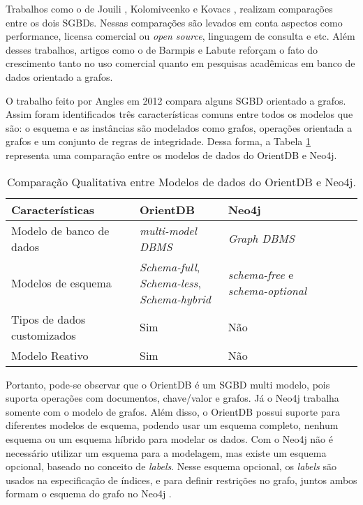 	Trabalhos como o de Jouili \cite{jouili2013empirical}, Kolomivcenko \cite{kolomivcenko2013experimental} e Kovacs \cite{kovacs2016cassandra}, realizam comparações entre os dois SGBDs. Nessas comparações são levados em conta aspectos como performance, licensa comercial ou \textit{open source}, linguagem de consulta e etc. Além desses trabalhos, artigos como o de Barmpis \cite{barmpis2014evaluation} e Labute \cite{labute2014review} reforçam o fato do crescimento tanto no uso comercial quanto em pesquisas acadêmicas em banco de dados orientado a grafos.

	O trabalho feito por Angles \cite{angles2012comparison} em 2012 compara alguns SGBD orientado a grafos. Assim foram identificados três características comuns entre todos os modelos que são: o esquema e as instâncias são modelados como grafos, operações orientada a grafos e um conjunto de regras de integridade. Dessa forma, a Tabela \ref{table:1} representa uma comparação entre os modelos de dados do OrientDB e Neo4j.
	
\begin{table}[h!]
\centering
\caption{Comparação Qualitativa entre Modelos de dados do OrientDB e Neo4j.}
\begin{tabular}{|l|l|l|l|l|}
\hline
Características                        & OrientDB                                                                        & Neo4j \\ \hline
Modelo de banco de dados    & \textit{multi-model DBMS}                                                       & \textit{Graph DBMS}  \\ \hline
Modelos de esquema          & \makecell{\textit{Schema-full},\\ \textit{Schema-less},\\ \textit{Schema-hybrid}} & \textit{schema-free} e \textit{schema-optional} \\ \hline
Tipos de dados customizados & Sim                                                                             & Não \\ \hline
Modelo Reativo              & Sim                                                                             & Não \\ \hline
\end{tabular}
\label{table:1}
\end{table}

	Portanto, pode-se observar que o OrientDB é um SGBD multi modelo, pois suporta operações com documentos, chave/valor e grafos. Já o Neo4j trabalha somente com o modelo de grafos. Além disso, o OrientDB possui suporte para diferentes modelos de esquema, podendo usar um esquema completo, nenhum esquema ou um esquema híbrido para modelar os dados. Com o Neo4j não é necessário utilizar um esquema para a modelagem, mas existe um esquema opcional, baseado no conceito de \textit{labels}. Nesse esquema opcional, os \textit{labels} são usados na especificação de índices, e para definir restrições no grafo, juntos ambos formam o esquema do grafo no Neo4j \cite{neo4jschemaoptional}. 
	
